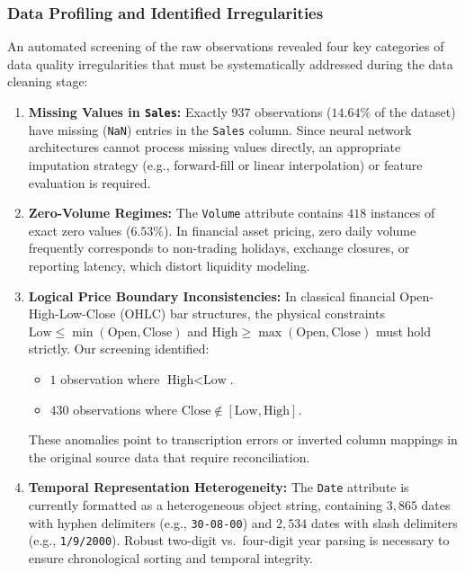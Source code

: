 \documentclass[conference]{IEEEtran}
\begin{document}
\subsubsection{Data Profiling and Identified Irregularities}
An automated screening of the raw observations revealed four key categories of data quality irregularities that must be systematically addressed during the data cleaning stage:

\begin{enumerate}
    \item \textbf{Missing Values in \texttt{Sales}:} Exactly $937$ observations ($14.64\%$ of the dataset) have missing (\texttt{NaN}) entries in the \texttt{Sales} column. Since neural network architectures cannot process missing values directly, an appropriate imputation strategy (e.g., forward-fill or linear interpolation) or feature evaluation is required.
    \item \textbf{Zero-Volume Regimes:} The \texttt{Volume} attribute contains $418$ instances of exact zero values ($6.53\%$). In financial asset pricing, zero daily volume frequently corresponds to non-trading holidays, exchange closures, or reporting latency, which distort liquidity modeling.
    \item \textbf{Logical Price Boundary Inconsistencies:} In classical financial Open-High-Low-Close (OHLC) bar structures, the physical constraints $\text{Low} \le \min(\text{Open}, \text{Close})$ and $\text{High} \ge \max(\text{Open}, \text{Close})$ must hold strictly. Our screening identified:
    \begin{itemize}
        \item $1$ observation where $\text{High} < \text{Low}$.
        \item $430$ observations where $\text{Close} \notin [\text{Low}, \text{High}]$.
    \end{itemize}
    These anomalies point to transcription errors or inverted column mappings in the original source data that require reconciliation.
    \item \textbf{Temporal Representation Heterogeneity:} The \texttt{Date} attribute is currently formatted as a heterogeneous object string, containing $3{,}865$ dates with hyphen delimiters (e.g., \texttt{30-08-00}) and $2{,}534$ dates with slash delimiters (e.g., \texttt{1/9/2000}). Robust two-digit vs.\ four-digit year parsing is necessary to ensure chronological sorting and temporal integrity.
\end{enumerate}
\end{document}
